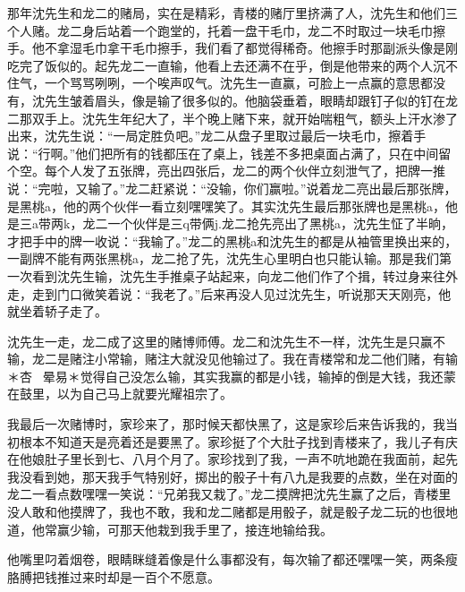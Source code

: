 \documentclass[12pt,UTF8]{ctexbook}
\begin{document}
那年沈先生和龙二的赌局，实在是精彩，青楼的赌厅里挤满了人，沈先生和他们三个人赌。龙二身后站着一个跑堂的，托着一盘干毛巾，龙二不时取过一块毛巾擦手。他不拿湿毛巾拿干毛巾擦手，我们看了都觉得稀奇。他擦手时那副派头像是刚吃完了饭似的。起先龙二一直输，他看上去还满不在乎，倒是他带来的两个人沉不住气，一个骂骂咧咧，一个唉声叹气。沈先生一直赢，可脸上一点赢的意思都没有，沈先生皱着眉头，像是输了很多似的。他脑袋垂着，眼睛却跟钉子似的钉在龙二那双手上。沈先生年纪大了，半个晚上赌下来，就开始喘粗气，额头上汗水渗了出来，沈先生说：“一局定胜负吧。”龙二从盘子里取过最后一块毛巾，擦着手说：“行啊。”他们把所有的钱都压在了桌上，钱差不多把桌面占满了，只在中间留个空。每个人发了五张牌，亮出四张后，龙二的两个伙伴立刻泄气了，把牌一推说：“完啦，又输了。”龙二赶紧说：“没输，你们赢啦。”说着龙二亮出最后那张牌，是黑桃a，他的两个伙伴一看立刻嘿嘿笑了。其实沈先生最后那张牌也是黑桃a，他是三a带两k，龙二一个伙伴是三q带俩j.龙二抢先亮出了黑桃a，沈先生怔了半晌，才把手中的牌一收说：“我输了。”龙二的黑桃a和沈先生的都是从袖管里换出来的，一副牌不能有两张黑桃a，龙二抢了先，沈先生心里明白也只能认输。那是我们第一次看到沈先生输，沈先生手推桌子站起来，向龙二他们作了个揖，转过身来往外走，走到门口微笑着说：“我老了。”后来再没人见过沈先生，听说那天天刚亮，他就坐着轿子走了。

沈先生一走，龙二成了这里的赌博师傅。龙二和沈先生不一样，沈先生是只赢不输，龙二是赌注小常输，赌注大就没见他输过了。我在青楼常和龙二他们赌，有输＊杏晕易＊觉得自己没怎么输，其实我赢的都是小钱，输掉的倒是大钱，我还蒙在鼓里，以为自己马上就要光耀祖宗了。

我最后一次赌博时，家珍来了，那时候天都快黑了，这是家珍后来告诉我的，我当初根本不知道天是亮着还是要黑了。家珍挺了个大肚子找到青楼来了，我儿子有庆在他娘肚子里长到七、八月个月了。家珍找到了我，一声不吭地跪在我面前，起先我没看到她，那天我手气特别好，掷出的骰子十有八九是我要的点数，坐在对面的龙二一看点数嘿嘿一笑说：“兄弟我又栽了。”龙二摸牌把沈先生赢了之后，青楼里没人敢和他摸牌了，我也不敢，我和龙二赌都是用骰子，就是骰子龙二玩的也很地道，他常赢少输，可那天他栽到我手里了，接连地输给我。

他嘴里叼着烟卷，眼睛眯缝着像是什么事都没有，每次输了都还嘿嘿一笑，两条瘦胳膊把钱推过来时却是一百个不愿意。
\end{document}
